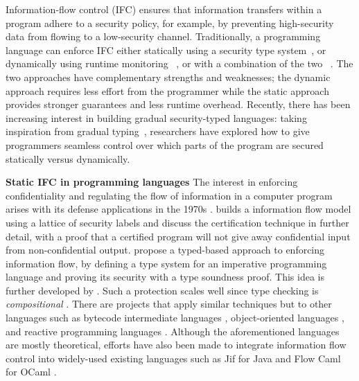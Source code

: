 Information-flow control (IFC) ensures that information transfers
within a program adhere to a security policy, for example, by
preventing high-security data from flowing to a low-security
channel.
Traditionally, a programming language can enforce IFC either statically
using a security type system~\parencite{volpano1996sound,Myers:1997aa,myers1999jflow},
or dynamically using runtime monitoring
~\parencite{Askarov:2009vq,austin2009efficient,Devriese:2010up,stefan2011flexible,Austin:2017uh},
or with a combination of the two
~\parencite{le2005monitoring,le2007automaton,Chandra:2007we,Shroff:2007tg}.
The two approaches have complementary strengths and weaknesses;
the dynamic approach requires less effort from the programmer
while the static approach provides stronger guarantees and
less runtime overhead. Recently, there has been increasing interest in
building gradual security-typed languages: taking inspiration from
gradual typing~\parencite{Siek:2006bh,Siek:2007qy,Tobin-Hochstadt:2006fk, Matthews:2007zr},
researchers have explored how to give programmers seamless control over
which parts of the program are secured statically versus dynamically.

\textbf{Static IFC in programming languages}
The interest in enforcing confidentiality and regulating the flow of
information in a computer program arises with its defense applications
in the 1970s \autocite{bell1976secure}.
\textcite{denning1976lattice}
builds a information flow model using a lattice of security labels and
\textcite{denning1977certification} discuss the certification technique
in further detail, with a proof that a certified program will not give
away confidential input from non-confidential output.
\textcite{volpano1996sound} propose a typed-based approach to enforcing
information flow, by defining a type system for an imperative
programming language and proving its security with a type soundness
proof. This idea is further developed by
\textcite{zdancewic2002programming}.  Such a protection scales well since
type checking is \textit{compositional}
\parencite{sabelfeld2003language}. There are projects that apply similar
techniques but to other languages
such as bytecode intermediate languages
\autocite{barthe2005non}, object-oriented languages
\autocite{amtoft2006logic}, and reactive programming languages
\autocite{bohannon2009reactive}. Although the aforementioned languages are
mostly theoretical, efforts have also been made to integrate information
flow control into widely-used existing languages such as Jif
for Java \autocite{myers1999jflow} and Flow Caml for OCaml
\autocite{pottier2002information, simonet2003flow}.

